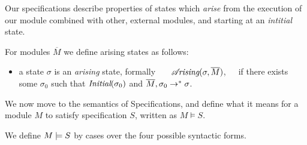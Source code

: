 {{Our specifications  describe  properties of states which \emph{arise} from the execution of our module combined with other, external modules, and
starting at an \emph{intitial} state. %


\begin{definition}
\label{def:arising}
For modules $\overline M$ we define arising  states as follows:

\begin{itemize}
\item
 a state $\sigma$ is 
{ an \emph{arising} state, formally \ \ \  $\mathcal{A}\!\textit{rising}(\sigma, \overline{M})$,\ \ \ if  there exists some $\sigma_0$ such that $\textit{Initial}(\sigma_0)$ and
$\overline{M}, {\sigma_0} \rightarrow^* {\sigma}$.}
\end{itemize}
\end{definition}
  
We now move to the semantics of \SpecLang Specifications, and   define what it means for  a module  $M$ to satisfy specification  $S$, written as $M \vDash S$.  
 
\begin{definition}%

We define $M \models {S}$ by cases over the four possible syntactic forms.

\label{def:necessity-semantics}


\end{definition}}}

